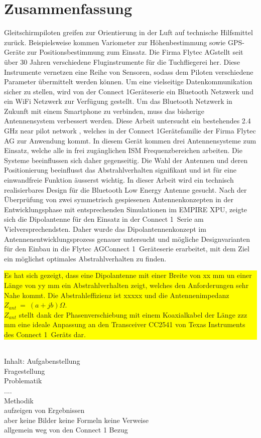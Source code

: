 \newpage
\section*{Zusammenfassung}

Gleitschirmpiloten greifen zur Orientierung in der Luft auf technische Hilfsmittel zurück. Beispielsweise kommen Variometer zur Höhenbestimmung sowie GPS-Geräte zur Positionsbestimmung zum Einsatz. Die Firma Flytec AGstellt seit über 30 Jahren verschiedene Fluginstrumente für die Tuchfliegerei her. Diese Instrumente vernetzen eine Reihe von Sensoren, sodass dem Piloten verschiedene Parameter übermittelt werden können. Um eine vielseitige Datenkommunikation sicher zu stellen, wird von der \glqq Connect 1\grqq Geräteserie ein Bluetooth Netzwerk und ein WiFi Netzwerk zur Verfügung gestellt. Um das Bluetooth Netzwerk in Zukunft mit einem Smartphone zu verbinden, muss das bisherige Antennensystem verbessert werden.
Diese Arbeit untersucht ein bestehendes 2.4 GHz \glqq near pilot network \grqq , welches in der \glqq Connect 1\grqq Gerätefamilie der Firma Flytec AG zur Anwendung kommt. 
In diesem  Gerät kommen drei Antennensysteme zum Einsatz, welche alle in frei zugänglichen ISM Frequenzbereichen arbeiten. Die Systeme beeinflussen sich daher gegenseitig. Die Wahl der Antennen und deren Positionierung beeinflusst das Abstrahlverhalten signifikant und ist für eine einwandfreie Funktion äusserst wichtig. In dieser Arbeit wird ein technisch realisierbares Design für die \glqq Bluetooth Low Energy \grqq Antenne gesucht.  
Nach der Überprüfung von zwei symmetrisch gespiesenen Antennenkonzepten in der Entwicklungsphase mit entsprechenden Simulationen im EMPIRE XPU, zeigte sich die Dipolantenne für den Einsatz in der  \glqq Connect 1\grqq \ Serie am Vielversprechendsten.
 Daher wurde das Dipolantennenkonzept im Antennenentwicklungsprozess genauer untersucht und mögliche Designvarianten für den Einbau in die Flytec AG\glqq Connect 1\grqq \ Geräteserie
  erarbeitet, mit dem Ziel ein möglichst optimales Abstrahlverhalten zu finden.\\
  \colorbox{yellow}{\parbox[t]{\textwidth}{Es hat sich gezeigt, dass eine Dipolantenne mit einer Breite von xx mm un einer Länge von yy mm 
   ein Abstrahlverhalten zeigt, welches den Anforderungen sehr Nahe kommt. 
   Die Abstrahleffizienz ist xxxxx und die Antennenimpedanz  $Z_{ant}\ = \ (a+jb)\Omega$. \\
   $Z_{ant}$ stellt dank der Phasenverschiebung  mit einem  Koaxialkabel der Länge zzz mm eine ideale Anpassung  an den Transceiver CC2541 von Texas Instruments des \glqq Connect 1\grqq  \ Geräts dar.}}\\

Inhalt:
Aufgabenstellung\\
Fragestellung\\
Problematik\\
....\\
Methodik\\
aufzeigen von Ergebnissen\\

aber keine Bilder keine Formeln keine Verweise\\

allgemein weg von den Connect 1 Bezug
